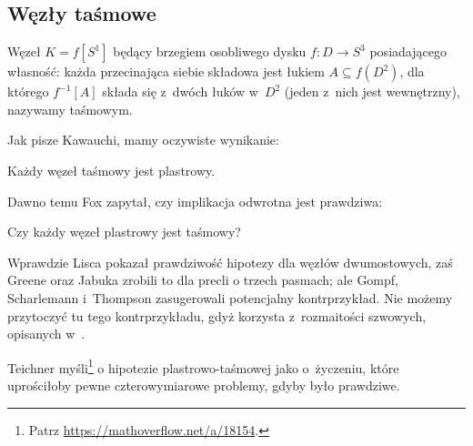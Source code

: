 
\subsection{Węzły taśmowe}
%

\begin{definition}
    Węzeł $K = f[S^1]$ będący brzegiem osobliwego dysku $f \colon D \to S^3$ posiadającego  własność: każda przecinająca siebie składowa jest łukiem $A \subseteq f(D^2)$, dla którego $f^{-1}[A]$ składa się z~dwóch łuków w~$D^2$ (jeden z~nich jest wewnętrzny), nazywamy taśmowym.
\end{definition}

Jak pisze Kawauchi, mamy oczywiste wynikanie:

\begin{proposition}
    Każdy węzeł taśmowy jest plastrowy.
%
\end{proposition}

Dawno temu Fox \cite[problem 1.33]{kirby1978} zapytał, czy implikacja odwrotna jest prawdziwa:
%

\begin{conjecture}
    Czy każdy węzeł plastrowy jest taśmowy?
\end{conjecture}

Wprawdzie Lisca \cite{lisca2007} pokazał prawdziwość hipotezy dla węzłów dwumostowych,
%
%
zaś Greene oraz Jabuka \cite{greene2011} zrobili to dla precli o trzech pasmach;
%
%
%
ale Gompf, Scharlemann i~Thompson \cite{gompf2010} zasugerowali potencjalny kontrprzykład.
%
%
%
Nie możemy przytoczyć tu tego kontrprzykładu, gdyż korzysta z~rozmaitości szwowych, opisanych w~\cite[s. 53-59]{kawauchi1996}.
%

Teichner myśli\footnote{Patrz \url{https://mathoverflow.net/a/18154}.} o hipotezie plastrowo-taśmowej jako o~życzeniu, które uprościłoby pewne czterowymiarowe problemy, gdyby było prawdziwe.
%



